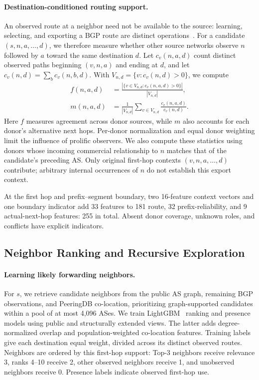 

\paragraph{Destination-conditioned routing support.}
An observed route at a neighbor need not be available to the source:
learning, selecting, and exporting a BGP route are distinct
operations~\cite{rfc4271}. For a candidate $(s,n,a,\ldots,d)$, we therefore
measure whether other source networks observe $n$ followed by $a$ toward
the same destination $d$. Let $c_v(n,a,d)$ count distinct observed paths
beginning $(v,n,a)$ and ending at $d$, and let
$c_v(n,d)=\sum_b c_v(n,b,d)$. With
$V_{n,d}=\{v:c_v(n,d)>0\}$, we compute
\begin{equation}
\begin{split}
f(n,a,d)&=\frac{|\{v\in V_{n,d}:c_v(n,a,d)>0\}|}{|V_{n,d}|},\\
m(n,a,d)&=\frac{1}{|V_{n,d}|}\sum_{v\in V_{n,d}}
                    \frac{c_v(n,a,d)}{c_v(n,d)}.
\end{split}
\label{eq:destination_evidence}
\end{equation}
Here $f$ measures agreement across donor sources, while $m$ also accounts
for each donor's alternative next hops. Per-donor normalization and equal
donor weighting limit the influence of prolific observers. We also compute
these statistics using donors whose incoming commercial relationship to
$n$ matches that of the candidate's preceding AS. Only original first-hop
contexts $(v,n,a,\ldots,d)$ contribute; arbitrary internal occurrences of
$n$ do not establish this export context.

At the first hop and prefix--segment boundary, two 16-feature context
vectors and one boundary indicator add 33 features to 181 route,
32 prefix-reliability, and 9 actual-next-hop features: 255 in total.
Absent donor coverage, unknown roles, and conflicts have explicit indicators.

\subsection{Neighbor Ranking and Recursive Exploration}
\label{sec:neighbor_selection}
\label{sec:recursion}

\paragraph{Learning likely forwarding neighbors.}
For $s$, we retrieve candidate neighbors from the public AS graph,
remaining BGP observations, and PeeringDB co-location, prioritizing
graph-supported candidates within a pool of at most 4,096 ASes. We train
LightGBM~\cite{ke2017lightgbm} ranking and presence models using public and
structurally extended views. The latter adds degree-normalized overlap and
population-weighted co-location features. Training labels give each destination
equal weight, divided across its distinct observed routes. Neighbors are
ordered by this first-hop support: Top-3 neighbors receive relevance 3,
ranks 4--10 receive 2, other observed neighbors receive 1, and unobserved
neighbors receive 0. Presence labels indicate observed first-hop use.

